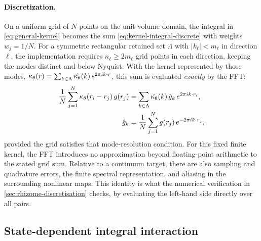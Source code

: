 \paragraph{Discretization.} On a uniform grid of $N$ points on the unit-volume domain, the integral in \cref{eq:general-kernel} becomes the sum \cref{eq:kernel-integral-discrete} with weights $w_j=1/N$. For a symmetric rectangular retained set $\Lambda$ with $|k_\ell|<m_\ell$ in direction $\ell$, the implementation requires $n_\ell\ge2m_\ell$ grid points in each direction, keeping the modes distinct and below Nyquist. With the kernel represented by those modes, $\kappa_\theta(r)=\sum_{k\in\Lambda}\hat{\kappa_\theta}(k)\,e^{2\pi i k\cdot r}$, this sum is evaluated \emph{exactly} by the FFT:
\begin{equation}
  \label{eq:fft-quadrature}
  \begin{aligned}
  \frac1N\sum_{j=1}^{N}\kappa_\theta(r_i-r_j)\,g(r_j) &= \sum_{k\in\Lambda}\hat{\kappa_\theta}(k)\,\hat g_k\,e^{2\pi i k\cdot r_i},\\
  \hat g_k &= \frac1N\sum_{j=1}^N g(r_j)\,e^{-2\pi i k\cdot r_j},
  \end{aligned}
\end{equation}
provided the grid satisfies that mode-resolution condition. For this fixed finite kernel, the FFT introduces no approximation beyond floating-point arithmetic to the stated grid sum. Relative to a continuum target, there are also sampling and quadrature errors, the finite spectral representation, and aliasing in the surrounding nonlinear maps. This identity is what the numerical verification in \cref{sec:rhizome-discretisation} checks, by evaluating the left-hand side directly over all pairs.

\subsection{State-dependent integral interaction}
\label{sec:rhizome-interaction}

